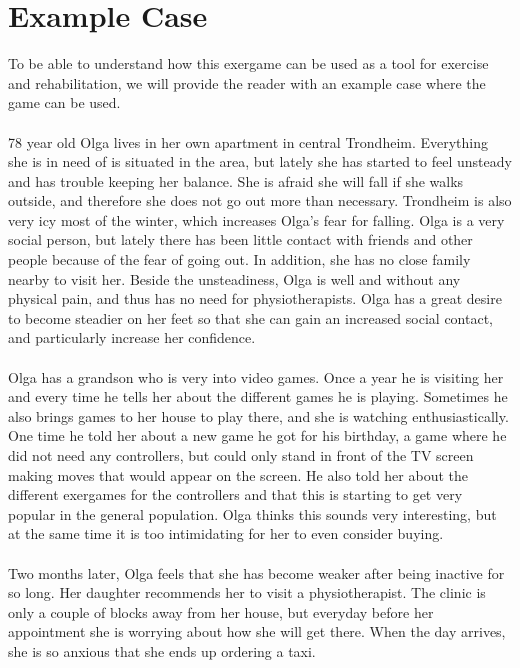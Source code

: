 \section{Example Case}
To be able to understand how this exergame can be used as a tool for exercise and rehabilitation, we will provide the reader with an example case where the game can be used. \\ \\
78 year old Olga lives in her own apartment in central Trondheim. Everything she is in need of is situated in the area, but lately she has started  to feel unsteady and has trouble keeping her balance. She is afraid she will fall if she walks outside, and therefore she does not go out more than necessary. Trondheim is also very icy most of the winter, which increases Olga's fear for falling. Olga is a very social person, but lately there has been little contact with friends and other people because of the fear of going out. In addition, she has no close family nearby to visit her. Beside the unsteadiness, Olga is well and without any physical pain, and thus has no need for physiotherapists. Olga has a great desire to become steadier on her feet so that she can gain an increased social contact, and particularly increase her confidence. \\ \\
Olga has a grandson who is very into video games. Once a year he is visiting her and every time he tells her about the different games he is playing. Sometimes he also brings games to her house to play there, and she is watching enthusiastically. One time he told her about a new game he got for his birthday, a game where he did not need any controllers, but could only stand in front of the TV screen making moves that would appear on the screen. He also told her about the different exergames for the controllers and that this is starting to get very popular in the general population. Olga thinks this sounds very interesting, but at the same time it is too intimidating for her to even consider buying.   \\ \\
Two months later, Olga feels that she has become weaker after being inactive for so long. Her daughter recommends her to visit a physiotherapist. The clinic is only a couple of blocks away from her house, but everyday before her appointment she is worrying about how she will get there. When the day arrives, she is so anxious that she ends up ordering a taxi. \\ \\
